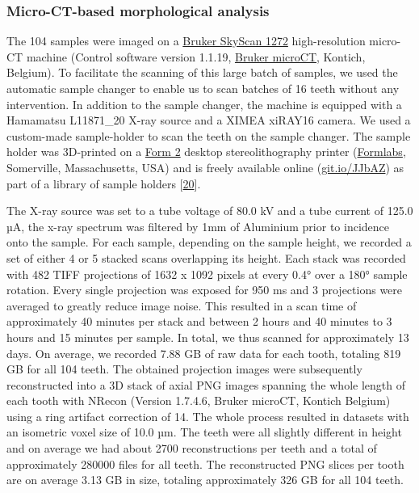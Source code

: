 \documentclass[
  american,
]{article}
\begin{document}
\hypertarget{micro-ct-based-morphological-analysis}{%
\subsubsection{Micro-CT-based morphological analysis}\label{micro-ct-based-morphological-analysis}}

The 104 samples were imaged on a \href{https://www.bruker.com/products/microtomography/micro-ct-for-sample-scanning/skyscan-1272/overview.html}{Bruker SkyScan 1272} high-resolution micro-CT machine (Control software version 1.1.19, \href{https://www.bruker.com/products/microtomography.html}{Bruker microCT}, Kontich, Belgium).
To facilitate the scanning of this large batch of samples, we used the automatic sample changer to enable us to scan batches of 16 teeth without any intervention.
In addition to the sample changer, the machine is equipped with a Hamamatsu L11871\_20 X-ray source and a XIMEA xiRAY16 camera.
We used a custom-made sample-holder to scan the teeth on the sample changer.
The sample holder was 3D-printed on a \href{https://formlabs.com/3d-printers/form-2/}{Form 2} desktop stereolithography printer (\href{https://formlabs.com/}{Formlabs}, Somerville, Massachusetts, USA) and is freely available online (\href{https://git.io/JJbAZ}{git.io/JJbAZ}) as part of a library of sample holders {[}\protect\hyperlink{ref-115PPSuQp}{20}{]}.

The X-ray source was set to a tube voltage of 80.0 kV and a tube current of 125.0 µA, the x-ray spectrum was filtered by 1mm of Aluminium prior to incidence onto the sample.
For each sample, depending on the sample height, we recorded a set of either 4 or 5 stacked scans overlapping its height.
Each stack was recorded with 482 TIFF projections of 1632 x 1092 pixels at every 0.4° over a 180° sample rotation.
Every single projection was exposed for 950 ms and 3 projections were averaged to greatly reduce image noise.
This resulted in a scan time of approximately 40 minutes per stack and between 2 hours and 40 minutes to 3 hours and 15 minutes per sample.
In total, we thus scanned for approximately 13 days.
On average, we recorded 7.88 GB of raw data for each tooth, totaling 819 GB for all 104 teeth.
The obtained projection images were subsequently reconstructed into a 3D stack of axial PNG images spanning the whole length of each tooth with NRecon (Version 1.7.4.6, Bruker microCT, Kontich Belgium) using a ring artifact correction of 14.
The whole process resulted in datasets with an isometric voxel size of 10.0 µm.
The teeth were all slightly different in height and on average we had about 2700 reconstructions per teeth and a total of approximately 280000 files for all teeth.
The reconstructed PNG slices per tooth are on average 3.13 GB in size, totaling approximately 326 GB for all 104 teeth.
\end{document}
